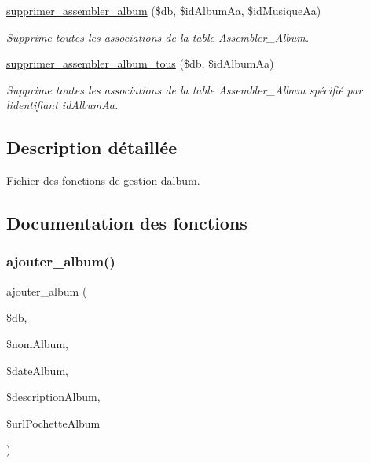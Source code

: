 \begin{DoxyCompactItemize}
\hyperlink{fonctionAlbum_8php_ae7db5b38c839b3fb5d22547e3bf7b085}{supprimer\+\_\+assembler\+\_\+album} (\$db, \$id\+Album\+Aa, \$id\+Musique\+Aa)
\begin{DoxyCompactList}\small\item\em Supprime toutes les associations de la table Assembler\+\_\+\+Album. \end{DoxyCompactList}\item 
\hyperlink{fonctionAlbum_8php_a81aa2a00c711c88b69cfce51a9779bcb}{supprimer\+\_\+assembler\+\_\+album\+\_\+tous} (\$db, \$id\+Album\+Aa)
\begin{DoxyCompactList}\small\item\em Supprime toutes les associations de la table Assembler\+\_\+\+Album spécifié par l\textquotesingle{}identifiant \textquotesingle{}id\+Album\+Aa\textquotesingle{}. \end{DoxyCompactList}\end{DoxyCompactItemize}


\subsection{Description détaillée}
Fichier des fonctions de gestion d\textquotesingle{}album. 



\subsection{Documentation des fonctions}
\mbox{\label{fonctionAlbum_8php_ac2453faf6d0805d8cb4afe186969393c}} 
\subsubsection{\texorpdfstring{ajouter\+\_\+album()}{ajouter\_album()}}
{\footnotesize\ttfamily ajouter\+\_\+album (\begin{DoxyParamCaption}\item[{}]{\$db,  }\item[{}]{\$nom\+Album,  }\item[{}]{\$date\+Album,  }\item[{}]{\$description\+Album,  }\item[{}]{\$url\+Pochette\+Album }\end{DoxyParamCaption})}




